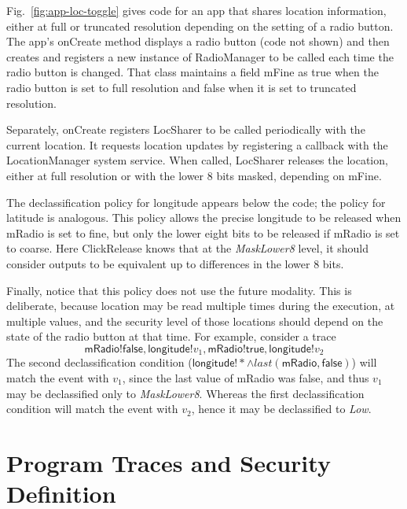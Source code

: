 \documentclass{llncs}
\newcommand{\code}[1]{\textsf{#1}} %
\newcommand{\toolname}{ClickRelease\xspace}
\newcommand{\tlast}[2]{\textit{last}(#1, #2)}
\begin{document}
Fig.~\ref{fig:app-loc-toggle} gives code for an app that
shares location information, either at full or truncated resolution
depending on the setting of a radio button. The app's \code{onCreate}
method displays a radio button (code not shown) and then creates and
registers a new instance of \code{RadioManager} to be called
each time the radio button is changed. That
class maintains a field \code{mFine} as \code{true} when the radio button is
set to full resolution and \code{false} when it is set to truncated
resolution.

Separately, \code{onCreate} registers \code{LocSharer} to be called
periodically with the current location.  It requests location updates
by registering a callback with the \code{LocationManager}
system service.  When called, \code{LocSharer} releases the
location, either at full resolution or with the lower 8 bits
masked, depending on \code{mFine}.

The declassification policy for longitude appears below the code; the
policy for latitude is analogous.  This policy allows the precise
longitude to be released when
\code{mRadio} is set to fine, but only the lower eight bits to
be released if \code{mRadio} is set to coarse. Here \toolname{}
knows that at the \textit{MaskLower8} level, it should consider
outputs to be equivalent up to differences in the lower 8
bits. 

Finally, notice that this policy does not use the future
modality. This is deliberate, because location may be read multiple
times during the execution, at multiple values, and the security level
of those locations should depend on the state of the
radio button at that time. For example, consider a trace
\begin{displaymath}
   \code{mRadio!false}, \code{longitude!}v_1,
    \code{mRadio!true}, \code{longitude!}v_2
\end{displaymath}
The second declassification condition ($\code{longitude}!\ast \wedge
\tlast{\code{mRadio}}{\code{false}}$) will match the event with $v_1$, since
the last value of \code{mRadio} was \code{false}, and
thus $v_1$ may be declassified only to \textit{MaskLower8}. Whereas
the first declassification condition will match the event with $v_2$, hence it
may be declassified to \textit{Low}.

\section{Program Traces and Security Definition}
\label{sec:formalism}
\end{document}
